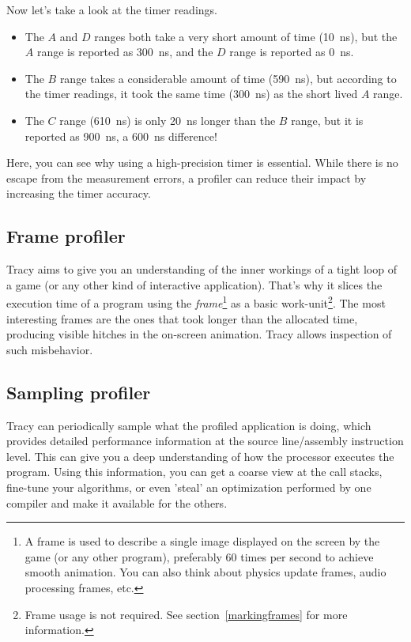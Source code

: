 \documentclass[hidelinks,titlepage,a4paper]{article}
\begin{document}
Now let's take a look at the timer readings.

\begin{itemize}
\item The $A$ and $D$ ranges both take a very short amount of time (10~\si{\nano\second}), but the $A$ range is reported as 300~\si{\nano\second}, and the $D$ range is reported as 0~\si{\nano\second}.
\item The $B$ range takes a considerable amount of time (590~\si{\nano\second}), but according to the timer readings, it took the same time (300~\si{\nano\second}) as the short lived $A$ range.
\item The $C$ range (610~\si{\nano\second}) is only 20~\si{\nano\second} longer than the $B$ range, but it is reported as 900~\si{\nano\second}, a 600~\si{\nano\second} difference!
\end{itemize}

Here, you can see why using a high-precision timer is essential. While there is no escape from the measurement errors, a profiler can reduce their impact by increasing the timer accuracy.

\subsection{Frame profiler}

Tracy aims to give you an understanding of the inner workings of a tight loop of a game (or any other kind of interactive application). That's why it slices the execution time of a program using the \emph{frame}\footnote{A frame is used to describe a single image displayed on the screen by the game (or any other program), preferably 60 times per second to achieve smooth animation. You can also think about physics update frames, audio processing frames, etc.} as a basic work-unit\footnote{Frame usage is not required. See section~\ref{markingframes} for more information.}. The most interesting frames are the ones that took longer than the allocated time, producing visible hitches in the on-screen animation. Tracy allows inspection of such misbehavior.

\subsection{Sampling profiler}

Tracy can periodically sample what the profiled application is doing, which provides detailed performance information at the source line/assembly instruction level. This can give you a deep understanding of how the processor executes the program. Using this information, you can get a coarse view at the call stacks, fine-tune your algorithms, or even 'steal' an optimization performed by one compiler and make it available for the others.
\end{document}
